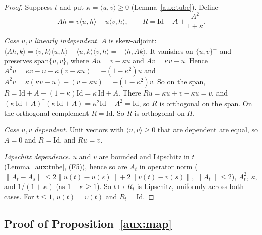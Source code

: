 \documentclass[11pt]{article}
\newcommand{\norm}[1]{\lVert #1\rVert}
\newcommand{\ip}[2]{\langle #1,#2\rangle}
\theoremstyle{definition}
\numberwithin{equation}{section}
\begin{document}
\begin{proof}
Suppress \(t\) and put \(\kappa=\ip uv\ge0\) (Lemma~\ref{aux:tube}).
Define
\[
 Ah=v\ip{u}{h}-u\ip{v}{h},
 \qquad R=\mathrm{Id}+A+\frac{A^2}{1+\kappa}.
\]

\emph{Case \(u,v\) linearly independent.} \(A\) is skew-adjoint:
\(\ip{Ah}{k}=\ip vk\ip uh-\ip uk\ip vh=-\ip h{Ak}\). It vanishes on
\(\{u,v\}^\perp\) and preserves \(\mathrm{span}\{u,v\}\), where
\(Au=v-\kappa u\) and \(Av=\kappa v-u\). Hence
\(A^2u=\kappa v-u-\kappa(v-\kappa u)=-(1-\kappa^2)u\) and
\(A^2v=\kappa(\kappa v-u)-(v-\kappa u)=-(1-\kappa^2)v\). So on the span,
\(R=\mathrm{Id}+A-(1-\kappa)\mathrm{Id}=\kappa\,\mathrm{Id}+A\). There
\(Ru=\kappa u+v-\kappa u=v\), and
\((\kappa\,\mathrm{Id}+A)^*(\kappa\,\mathrm{Id}+A)
=\kappa^2\mathrm{Id}-A^2=\mathrm{Id}\), so \(R\) is orthogonal on the
span. On the orthogonal complement \(R=\mathrm{Id}\). So \(R\) is
orthogonal on \(H\).

\emph{Case \(u,v\) dependent.} Unit vectors with \(\ip uv\ge0\) that are
dependent are equal, so \(A=0\) and \(R=\mathrm{Id}\), and \(Ru=v\).

\emph{Lipschitz dependence.} \(u\) and \(v\) are bounded and Lipschitz in
\(t\) (Lemma~\ref{aux:tube}, (F5)), hence so are \(A_t\) in operator norm
(\(\norm{A_t-A_s}\le2\norm{u(t)-u(s)}+2\norm{v(t)-v(s)}\),
\(\norm{A_t}\le2\)), \(A_t^2\), \(\kappa\), and \(1/(1+\kappa)\) (as
\(1+\kappa\ge1\)). So \(t\mapsto R_t\) is Lipschitz, uniformly across
both cases. For \(t\le1\), \(u(t)=v(t)\) and \(R_t=\mathrm{Id}\).
\end{proof}

\subsection{Proof of Proposition~\ref{aux:map}}
\end{document}
